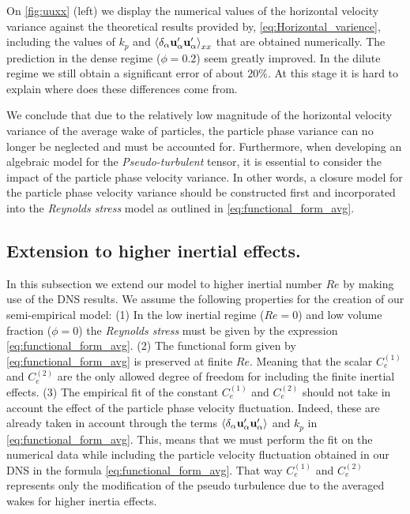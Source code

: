 On \ref{fig:uuxx} (left) we display the numerical values of the horizontal velocity variance against the theoretical results provided by, \ref{eq:Horizontal_varience}, including the values of $k_p$ and $\left<\delta_\alpha \textbf{u}_\alpha'\textbf{u}_\alpha'\right>_{xx}$ that are obtained numerically. 
The prediction in the dense regime ($\phi = 0.2$) seem greatly improved. 
In the dilute regime we still obtain a significant error of about $20\%$. 
At this stage it is hard to explain where does these differences come from. 

We conclude that due to the relatively low magnitude of the horizontal velocity variance of the average wake of particles, the particle phase variance can no longer be neglected and must be accounted for. 
Furthermore, when developing an algebraic model for the \textit{Pseudo-turbulent} tensor, it is essential to consider the impact of the particle phase velocity variance. 
In other words, a closure model for the particle phase velocity variance should be constructed first and incorporated into the \textit{Reynolds stress} model as outlined in \ref{eq:functional_form_avg}. 


\subsection{Extension to higher inertial effects. }

In this subsection we extend our model to higher inertial number $Re$ by making use of the DNS results. 
We assume the following properties for the creation of our semi-empirical model: 
(1) In the low inertial regime ($Re=0$) and low volume fraction ($\phi=0$) the \textit{Reynolds stress} must be given by the expression \ref{eq:functional_form_avg}. 
(2) The functional form given by \ref{eq:functional_form_avg} is preserved at finite $Re$. 
Meaning that the scalar $C_e^{(1)}$ and $C_e^{(2)}$ are the only allowed degree of freedom for including the finite inertial effects. 
(3) The empirical fit of the constant  $C_e^{(1)}$ and $C_e^{(2)}$ should not take in account the effect of the particle phase velocity fluctuation. 
Indeed, these are already taken in account through the terms $\left<\delta_\alpha \textbf{u}_\alpha'\textbf{u}_\alpha'\right>$ and $k_p$ in \ref{eq:functional_form_avg}. 
This, means that we must perform the fit on the numerical data while including the particle velocity fluctuation obtained in our DNS in the formula \eqref{eq:functional_form_avg}.
That way $C_e^{(1)}$ and $C_e^{(2)}$ represents only the modification of the pseudo turbulence due to the averaged wakes for higher inertia effects.  



